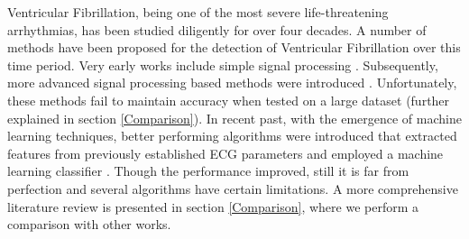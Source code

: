 \documentclass[12pt,a4paper]{article}
\begin{document}
Ventricular Fibrillation, being one of the most severe life-threatening arrhythmias, has been studied diligently for over four decades. A number of methods have been proposed for the detection of Ventricular Fibrillation over this time period. Very early works include simple signal processing \cite{thakor1990ventricular,chen1987ventricular,kuo1978computer,barro1989algorithmic,zhang1999detecting}. Subsequently, more advanced signal processing based methods were introduced \cite{arafat2009detection,anas2011exploiting,amann2005new,amann2007detecting}. Unfortunately, these methods fail to maintain accuracy when tested on a large dataset \cite{amann2005reliability} (further explained in section \ref{Comparison}). In recent past, with the emergence of machine learning techniques, better performing algorithms were introduced that extracted features from previously established ECG parameters and employed a machine learning classifier \cite{alonso2012feature,alonso2014detection,li2014ventricular,verma2016detection,song2005support,asl2008support,clayton1994recognition}. Though the performance improved, still it is far from perfection and several algorithms have certain limitations. A more comprehensive literature review is presented in section \ref{Comparison}, where we perform a comparison with other works.


\end{document}
